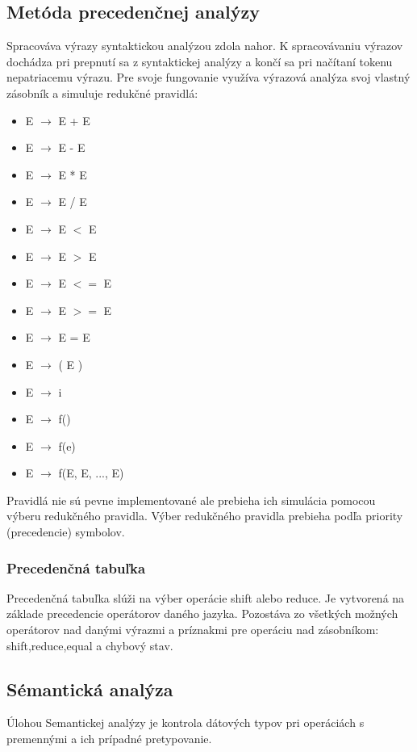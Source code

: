 \documentclass[a4paper]{article}
\begin{document}
\subsection{Metóda precedenčnej analýzy}
Spracováva výrazy syntaktickou analýzou zdola nahor. K spracovávaniu výrazov dochádza pri prepnutí sa z syntaktickej analýzy a končí sa pri načítaní tokenu nepatriacemu výrazu. Pre svoje fungovanie využíva výrazová analýza svoj vlastný zásobník a simuluje redukčné pravidlá:
\begin{itemize}
\item{E $\rightarrow$ E + E}
\item{E $\rightarrow$ E - E}
\item{E $\rightarrow$ E * E}
\item{E $\rightarrow$ E / E}
\item{E $\rightarrow$ E $<$ E}
\item{E $\rightarrow$ E $>$ E}
\item{E $\rightarrow$ E $<=$ E}
\item{E $\rightarrow$ E $>=$ E}
\item{E $\rightarrow$ E = E}
\item{E $\rightarrow$ ( E )}
\item{E $\rightarrow$ i}
\item{E $\rightarrow$ f()}
\item{E $\rightarrow$ f(e)}
\item{E $\rightarrow$ f(E, E, ..., E)}
\end{itemize}
Pravidlá nie sú pevne implementované ale prebieha ich simulácia pomocou výberu redukčného pravidla.
Výber redukčného pravidla prebieha podľa priority (precedencie) symbolov.

\subsubsection{Precedenčná tabuľka}
Precedenčná tabuľka slúži na výber operácie shift alebo reduce. Je vytvorená na základe precedencie operátorov daného jazyka. Pozostáva zo všetkých možných operátorov nad danými výrazmi a príznakmi pre operáciu nad zásobníkom: shift,reduce,equal a chybový stav.

\subsection{Sémantická analýza}
Úlohou Semantickej analýzy je kontrola dátových typov pri operáciách s premennými a ich prípadné pretypovanie.
\end{document}
